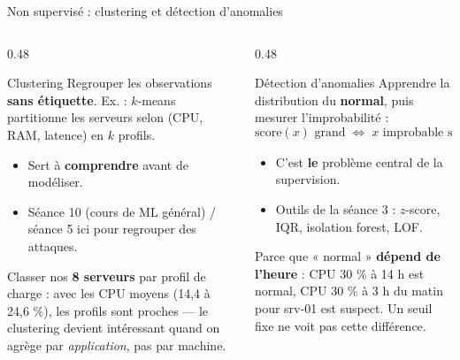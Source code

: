 \begin{frame}{Non supervisé : clustering et détection d'anomalies}
\begin{columns}[t]
\begin{column}{0.48\textwidth}
\begin{block}{Clustering}
Regrouper les observations \textbf{sans étiquette}. Ex. : $k$-means
partitionne les serveurs selon (CPU, RAM, latence) en $k$ profils.
\begin{itemize}
\item Sert à \textbf{comprendre} avant de modéliser.
\item Séance 10 (cours de ML général) / séance 5 ici pour regrouper des attaques.
\end{itemize}
\end{block}
\begin{ebox}
Classer nos \textbf{8 serveurs} par profil de charge : avec les CPU moyens
(14,4 à 24,6 \%), les profils sont proches --- le clustering devient intéressant
quand on agrège par \emph{application}, pas par machine.
\end{ebox}
\end{column}
\begin{column}{0.48\textwidth}
\begin{block}{Détection d'anomalies}
Apprendre la distribution du \textbf{normal}, puis mesurer l'improbabilité :
\[
\text{score}(x) \text{ grand}
\;\Longleftrightarrow\;
x \text{ improbable sous } p_{\text{norm}}
\]
\begin{itemize}
\item C'est \textbf{le} problème central de la supervision.
\item Outils de la séance 3 : $z$-score, IQR, isolation forest, LOF.
\end{itemize}
\end{block}
\begin{kbox}
Parce que « normal » \textbf{dépend de l'heure} : CPU 30 \% à 14 h est normal,
CPU 30 \% à 3 h du matin pour srv-01 est suspect. Un seuil fixe ne voit pas cette différence.
\end{kbox}
\end{column}
\end{columns}
\end{frame}

